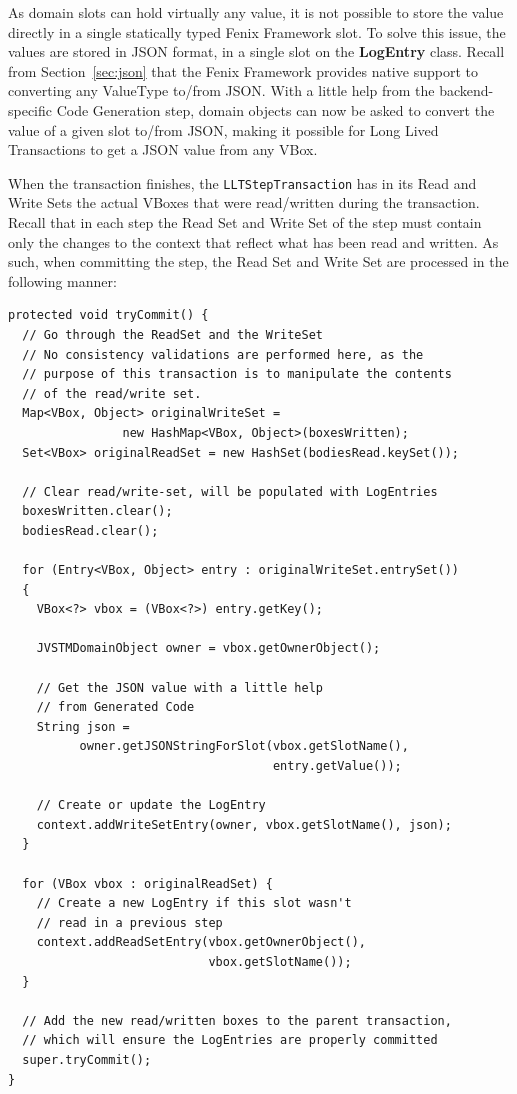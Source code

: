 As domain slots can hold virtually any value, it is not possible to
store the value directly in a single statically typed Fenix Framework
slot. To solve this issue, the values are stored in JSON format, in a
single slot on the {\bf LogEntry} class. Recall from
Section~\ref{sec:json} that the Fenix Framework provides native
support to converting any ValueType to/from JSON. With a little help
from the backend-specific Code Generation step, domain objects can now
be asked to convert the value of a given slot to/from JSON, making it
possible for Long Lived Transactions to get a JSON value from any
VBox.

When the transaction finishes, the \texttt{LLTStepTransaction} has in
its Read and Write Sets the actual VBoxes that were read/written
during the transaction. Recall that in each step the Read Set and
Write Set of the step must contain only the changes to the context
that reflect what has been read and written. As such, when committing
the step, the Read Set and Write Set are processed in the following
manner:

\begin{lstlisting}[caption={Algorithm for committing a Long Lived
    Transaction's step}]
protected void tryCommit() {
  // Go through the ReadSet and the WriteSet
  // No consistency validations are performed here, as the 
  // purpose of this transaction is to manipulate the contents
  // of the read/write set.
  Map<VBox, Object> originalWriteSet = 
                new HashMap<VBox, Object>(boxesWritten);
  Set<VBox> originalReadSet = new HashSet(bodiesRead.keySet());

  // Clear read/write-set, will be populated with LogEntries
  boxesWritten.clear();
  bodiesRead.clear();

  for (Entry<VBox, Object> entry : originalWriteSet.entrySet()) 
  {
    VBox<?> vbox = (VBox<?>) entry.getKey();

    JVSTMDomainObject owner = vbox.getOwnerObject();

    // Get the JSON value with a little help
    // from Generated Code
    String json = 
          owner.getJSONStringForSlot(vbox.getSlotName(), 
                                     entry.getValue());

    // Create or update the LogEntry
    context.addWriteSetEntry(owner, vbox.getSlotName(), json);
  }

  for (VBox vbox : originalReadSet) {
    // Create a new LogEntry if this slot wasn't
    // read in a previous step
    context.addReadSetEntry(vbox.getOwnerObject(), 
                            vbox.getSlotName());
  }

  // Add the new read/written boxes to the parent transaction,
  // which will ensure the LogEntries are properly committed
  super.tryCommit();
}
\end{lstlisting}

